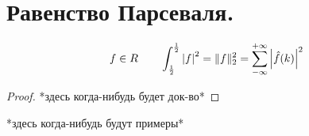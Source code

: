 \documentclass[matan]{subfiles}
\begin{document}
  \newpage
  \section{Равенство Парсеваля.}
  \hypertarget{q60}{}
  \begin{consequence}
    \[f \in R \qquad \int_{\frac{1}{2}}^{\frac{1}{2}} \left|f\right|^2 = \lVert f \rVert^2_2 = \sum_{-\infty}^{+\infty} \left|\hat{f}(k)\right|^2\]
  \end{consequence}

  \begin{proof}
    *здесь когда-нибудь будет док-во*
  \end{proof}

  \begin{examples}
    *здесь когда-нибудь будут примеры*
  \end{examples}
\end{document}
